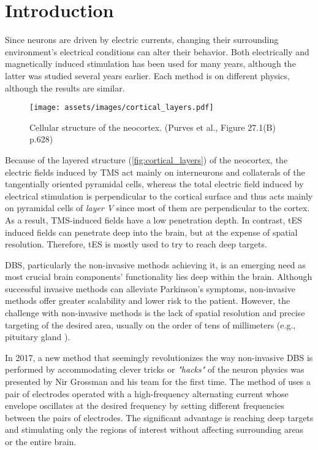 \pagebreak
{}
\chapter{Introduction}

Since neurons are driven by electric currents, changing their surrounding environment's electrical conditions can alter their behavior. Both electrically and magnetically induced stimulation has been used for many years, although the latter was studied several years earlier. Each method is on different physics, although the results are similar.

\begin{wrapfigure}{l}{0.40\textwidth}
    \centering
    \texttt{[image: assets/images/cortical\_layers.pdf]}
    \caption{Cellular structure of the neocortex. (Purves et al.\cite{Purves2012}, Figure 27.1(B) p.628)}
    \label{fig:cortical_layers}
\end{wrapfigure}

Because of the layered structure (\autoref{fig:cortical_layers}) of the neocortex, the electric fields induced by \gls{TMS} act mainly on interneurons and collaterals of the tangentially oriented pyramidal cells, whereas the total electric field induced by electrical stimulation is perpendicular to the cortical surface and thus acts mainly on pyramidal cells of \textit{layer V} since most of them are perpendicular to the cortex. As a result, \gls{TMS}-induced fields have a low penetration depth. In contrast, \gls{tES} induced fields can penetrate deep into the brain, but at the expense of spatial resolution. Therefore, \gls{tES} is mostly used to try to reach deep targets. 

\gls{DBS}, particularly the non-invasive methods achieving it, is an emerging need as most crucial brain components' functionality lies deep within the brain. Although successful invasive methods can alleviate Parkinson's symptoms, non-invasive methods offer greater scalability and lower risk to the patient. However, the challenge with non-invasive methods is the lack of spatial resolution and precise targeting of the desired area, usually on the order of tens of millimeters (e.g., pituitary gland \cite{Yadav2017_pituitary}).

In 2017, a new method that seemingly revolutionizes the way non-invasive \gls{DBS} is performed by accommodating clever tricks or \textit{"hacks"} of the neuron physics was presented by Nir Grossman and his team \cite{Grossman2017} for the first time. The method of  uses a pair of electrodes operated with a high-frequency alternating current whose envelope oscillates at the desired frequency by setting different frequencies between the pairs of electrodes. The significant advantage is reaching deep targets and stimulating only the regions of interest without affecting surrounding areas or the entire brain.

